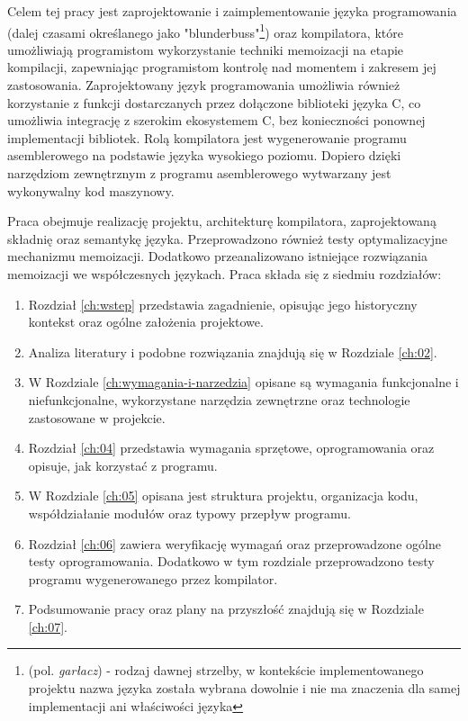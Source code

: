 Celem tej pracy jest zaprojektowanie i zaimplementowanie języka programowania (dalej czasami określanego jako "blunderbuss"\footnote{(pol. \textit{garłacz}) - rodzaj dawnej strzelby, w kontekście implementowanego projektu nazwa języka została wybrana dowolnie i nie ma znaczenia dla samej implementacji ani właściwości języka}) oraz kompilatora, które umożliwiają programistom wykorzystanie techniki memoizacji na etapie kompilacji, zapewniając programistom kontrolę nad momentem i zakresem jej zastosowania. Zaprojektowany język programowania umożliwia również korzystanie z funkcji dostarczanych przez dołączone biblioteki języka C, co umożliwia integrację z szerokim ekosystemem C, bez konieczności ponownej implementacji bibliotek. Rolą kompilatora jest wygenerowanie programu asemblerowego na podstawie języka wysokiego poziomu. Dopiero dzięki narzędziom zewnętrznym z programu asemblerowego wytwarzany jest wykonywalny kod maszynowy.

Praca obejmuje realizację projektu, architekturę kompilatora, zaprojektowaną składnię oraz semantykę języka. Przeprowadzono również testy optymalizacyjne mechanizmu memoizacji. Dodatkowo przeanalizowano istniejące rozwiązania memoizacji we współczesnych językach. Praca składa się z siedmiu rozdziałów:

\begin{enumerate}
    \item Rozdział \ref{ch:wstep} przedstawia zagadnienie, opisując jego historyczny kontekst oraz ogólne założenia projektowe.
    \item Analiza literatury i podobne rozwiązania znajdują się w Rozdziale \ref{ch:02}.
    \item W Rozdziale \ref{ch:wymagania-i-narzedzia} opisane są wymagania funkcjonalne i niefunkcjonalne, wykorzystane narzędzia zewnętrzne oraz technologie zastosowane w projekcie.
    \item Rozdział \ref{ch:04} przedstawia wymagania sprzętowe, oprogramowania oraz opisuje, jak korzystać z programu.
    \item W Rozdziale \ref{ch:05} opisana jest struktura projektu, organizacja kodu, współdziałanie modułów oraz typowy przepływ programu.
    \item Rozdział \ref{ch:06} zawiera weryfikację wymagań oraz przeprowadzone ogólne testy oprogramowania. Dodatkowo w tym rozdziale przeprowadzono testy programu wygenerowanego przez kompilator.
    \item Podsumowanie pracy oraz plany na przyszłość znajdują się w Rozdziale \ref{ch:07}.
\end{enumerate}
